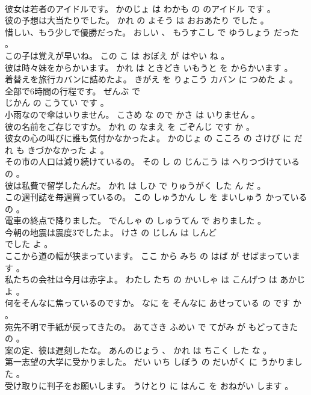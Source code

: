 \documentclass[8pt]{extreport}
\begin{document}
\begin{CJK}{UTF8}{min}
\\	彼女は若者のアイドルです。	かのじょ は わかも の のアイドル です 。 
\\	彼の予想は大当たりでした。	かれ の よそう は おおあたり でした 。 
\\	惜しい、もう少しで優勝だった。	おしい 、 もうすこし で ゆうしょう だった 。 
\\	この子は覚えが早いね。	この こ は おぼえ が はやい ね 。 
\\	彼は時々妹をからかいます。	かれ は ときどき いもうと を からかいます 。 
\\	着替えを旅行カバンに詰めたよ。	きがえ を りょこう カバン に つめた よ 。 
\\	全部で6時間の行程です。	ぜんぶ で 
\\	じかん の こうてい です 。 
\\	小雨なので傘はいりません。	こさめ な ので かさ は いりません 。 
\\	彼の名前をご存じですか。	かれ の なまえ を ごぞんじ です か 。 
\\	彼女の心の叫びに誰も気付かなかったよ。	かのじょ の こころ の さけび に だれ も きづかなかった よ 。 
\\	その市の人口は減り続けているの。	その し の じんこう は へりつづけている の 。 
\\	彼は私費で留学したんだ。	かれ は しひ で りゅうがく した ん だ 。 
\\	この週刊誌を毎週買っているの。	この しゅうかん し を まいしゅう かっている の 。 
\\	電車の終点で降りました。	でんしゃ の しゅうてん で おりました 。 
\\	今朝の地震は震度3でしたよ。	けさ の じしん は しんど 
\\	でした よ 。 
\\	ここから道の幅が狭まっています。	ここ から みち の はば が せばまっています 。 
\\	私たちの会社は今月は赤字よ。	わたし たち の かいしゃ は こんげつ は あかじ よ 。 
\\	何をそんなに焦っているのですか。	なに を そんなに あせっている の です か 。 
\\	宛先不明で手紙が戻ってきたの。	あてさき ふめい で てがみ が もどってきた の 。 
\\	案の定、彼は遅刻したな。	あんのじょう 、 かれ は ちこく した な 。 
\\	第一志望の大学に受かりました。	だい いち しぼう の だいがく に うかりました 。 
\\	受け取りに判子をお願いします。	うけとり に はんこ を おねがい します 。 

\end{CJK}
\end{document}
